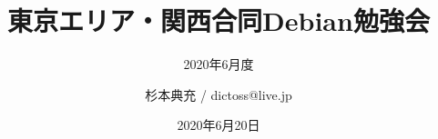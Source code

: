 \title{東京エリア・関西合同Debian勉強会}
\subtitle{2020年6月度} %
\author{杉本典充 / dictoss@live.jp}
\date{2020年6月20日}



\begin{frame}
\titlepage{}
\end{frame}


